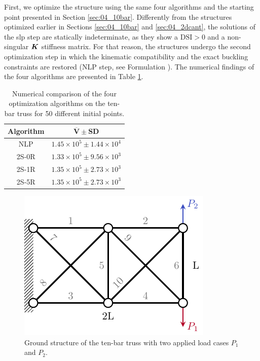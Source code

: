 First, we optimize the structure using the same four algorithms and the starting point presented in Section \ref{sec:04_10bar}. Differently from the structures optimized earlier in Sections \ref{sec:04_10bar} and \ref{sec:04_2dcant}, the solutions of the \gls{slp} step are statically indeterminate, as they show a $\text{DSI}>0$ and a non-singular $\bm{K}$ stiffness matrix. For that reason, the structures undergo the second optimization step in which the kinematic compatibility and the exact buckling constraints are restored (NLP step, see Formulation ). The numerical findings of the four algorithms are presented in Table \ref{tab:04_10_bar_multi_solution}.

\begin{table}
    \small
\centering
\begin{tabular}{cc}
\toprule
\textbf{Algorithm} &
  \multicolumn{1}{c}{$\bm{\overline{V}} \pm \textbf{SD}$}\\ \midrule
NLP & $1.45\times 10^5\pm1.44\times 10^4 $ \\
2S-0R & $1.33\times 10^5\pm9.56\times 10^3 $ \\
2S-1R & $1.35\times 10^5\pm2.73\times 10^3 $ \\
2S-5R & $1.35\times 10^5\pm2.73\times 10^3 $ \\
\bottomrule
\end{tabular}
\caption{Numerical comparison of the four optimization algorithms on the ten-bar truss for 50 different initial points.}
\label{tab:04_10_bar_multi_solution}
\end{table}

\begin{figure}
    \centering
    \includegraphics{figures/04_TTO_improvements/18_10_bar_multi_BC/10_bar_BC_multi.pdf}
    \caption{Ground structure of the ten-bar truss with two applied load cases $P_1$ and $P_2$.}
    \label{fig:04_10-bar-bcs-multi}
\end{figure}

